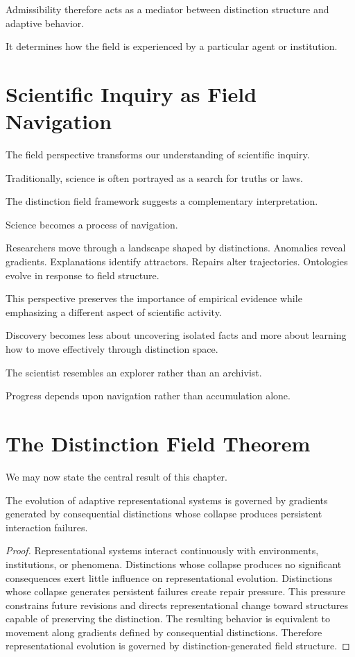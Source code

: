 \documentclass[11pt,oneside,openany]{book}
\begin{document}
Admissibility therefore acts as a mediator between distinction structure and adaptive behavior.

It determines how the field is experienced by a particular agent or institution.

\section{Scientific Inquiry as Field Navigation}

The field perspective transforms our understanding of scientific inquiry.

Traditionally, science is often portrayed as a search for truths or laws.

The distinction field framework suggests a complementary interpretation.

Science becomes a process of navigation.

Researchers move through a landscape shaped by distinctions. Anomalies reveal gradients. Explanations identify attractors. Repairs alter trajectories. Ontologies evolve in response to field structure.

This perspective preserves the importance of empirical evidence while emphasizing a different aspect of scientific activity.

Discovery becomes less about uncovering isolated facts and more about learning how to move effectively through distinction space.

The scientist resembles an explorer rather than an archivist.

Progress depends upon navigation rather than accumulation alone.

\section{The Distinction Field Theorem}

We may now state the central result of this chapter.

\begin{theorem}

The evolution of adaptive representational systems is governed by gradients generated by consequential distinctions whose collapse produces persistent interaction failures.

\end{theorem}

\begin{proof}

Representational systems interact continuously with environments, institutions, or phenomena. Distinctions whose collapse produces no significant consequences exert little influence on representational evolution. Distinctions whose collapse generates persistent failures create repair pressure. This pressure constrains future revisions and directs representational change toward structures capable of preserving the distinction. The resulting behavior is equivalent to movement along gradients defined by consequential distinctions. Therefore representational evolution is governed by distinction-generated field structure.

\end{proof}
\end{document}
